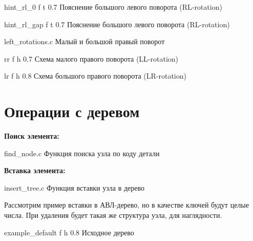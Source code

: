 \documentclass{bmstu}
\begin{document}
        {hint_rl_0} %
        {f} %
        {t} %
        {0.7\textwidth} %
        {Пояснение большого левого поворота (RL-rotation)} %

        {hint_rl_gap} %
        {f} %
        {t} %
        {0.7\textwidth} %
        {Пояснение большого левого поворота (RL-rotation)}


   
    \clearpage
        {left_rotations.c}
        {Малый и большой правый поворот}

        {rr} %
        {f} %
        {h} %
        {0.7\textwidth} %
        {Схема малого правого поворота (LL-rotation)} %

        {lr} %
        {f} %
        {h} %
        {0.8\textwidth} %
        {Схема большого правого поворота (LR-rotation)} %


    \section{Операции с деревом}

    \textbf{Поиск элемента:}

        {find_node.c}
        {Функция поиска узла по коду детали}

    \textbf{Вставка элемента:}

        {insert_tree.c}
        {Функция вставки узла в дерево}
    
    Рассмотрим пример вставки в АВЛ-дерево, но в качестве ключей будут целые числа.
    При удаления будет такая же структура узла, для наглядности.

        {example_default} %
        {f} %
        {h} %
        {0.8\textwidth} %
        {Исходное дерево} %
\end{document}
